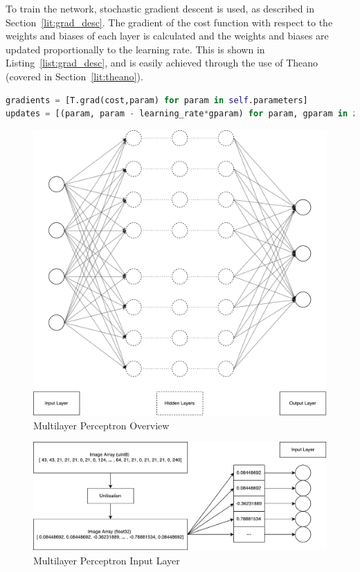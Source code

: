 To train the network, stochastic gradient descent is used, as described in Section~\ref{lit:grad_desc}. The gradient of the cost function with respect to the weights and biases of each layer is calculated and the weights and biases are updated proportionally to the learning rate. This is shown in Listing~\ref{list:grad_desc}, and is easily achieved through the use of Theano (covered in Section~\ref{lit:theano}).

\begin{lstlisting}[language=Python, caption=Implementing Gradient Descent, captionpos=b, label={list:grad_desc}]
gradients = [T.grad(cost,param) for param in self.parameters]
updates = [(param, param - learning_rate*gparam) for param, gparam in zip(parameters,gradients)]
\end{lstlisting}


\begin{figure}[!h]
	
	\centering
	\includegraphics[width=\textwidth]{figures/multilayer_perceptron}
	\centering
	\caption{Multilayer Perceptron Overview}
	\label{fig:multi}
\end{figure}


\begin{figure}[!h]
	
	\centering
	\includegraphics[width=\textwidth]{figures/multilayer_perceptron_input}
	\centering
	\caption{Multilayer Perceptron Input Layer}
	\label{fig:multi_input}
\end{figure}


